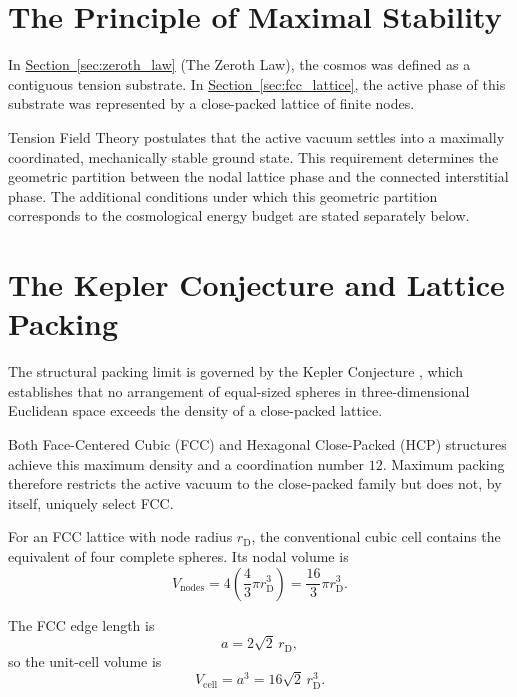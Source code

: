\section{The Principle of Maximal Stability}

In \hyperref[sec:zeroth_law]{Section~\ref*{sec:zeroth_law}} (The Zeroth Law), the cosmos was defined as a contiguous tension substrate. In \hyperref[sec:fcc_lattice]{Section~\ref*{sec:fcc_lattice}}, the active phase of this substrate was represented by a close-packed lattice of finite nodes.

Tension Field Theory postulates that the active vacuum settles into a maximally coordinated, mechanically stable ground state. This requirement determines the geometric partition between the nodal lattice phase and the connected interstitial phase. The additional conditions under which this geometric partition corresponds to the cosmological energy budget are stated separately below.

\section{The Kepler Conjecture and Lattice Packing}
\label{sec:lattice_packing}

The structural packing limit is governed by the Kepler Conjecture \cite{Hales_2005}, which establishes that no arrangement of equal-sized spheres in three-dimensional Euclidean space exceeds the density of a close-packed lattice.

Both Face-Centered Cubic (FCC) and Hexagonal Close-Packed (HCP) structures achieve this maximum density and a coordination number $12$. Maximum packing therefore restricts the active vacuum to the close-packed family but does not, by itself, uniquely select FCC.

For an FCC lattice with node radius $r_{\mathrm{D}}$, the conventional cubic cell contains the equivalent of four complete spheres. Its nodal volume is
\begin{equation}
    V_{\mathrm{nodes}} = 4 \left( \frac{4}{3}\pi r_{\mathrm{D}}^3 \right) = \frac{16}{3}\pi r_{\mathrm{D}}^3.
\end{equation}

The FCC edge length is
\begin{equation}
    a = 2\sqrt{2}\,r_{\mathrm{D}},
\end{equation}
so the unit-cell volume is
\begin{equation}
    V_{\mathrm{cell}} = a^3 = 16\sqrt{2}\,r_{\mathrm{D}}^3.
\end{equation}

